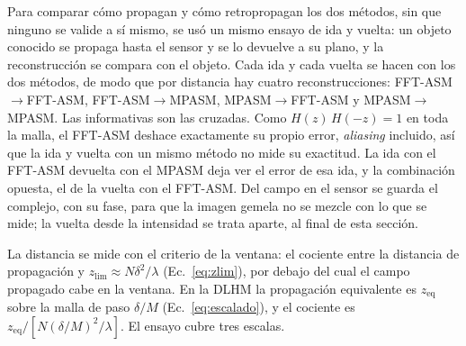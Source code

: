 Para comparar cómo propagan y cómo retropropagan los dos métodos, sin que
ninguno se valide a sí mismo, se usó un mismo ensayo de ida y vuelta: un
objeto conocido se propaga hasta el sensor y se lo devuelve a su plano, y la
reconstrucción se compara con el objeto. Cada ida y cada vuelta se hacen con
los dos métodos, de modo que por distancia hay cuatro reconstrucciones:
FFT-ASM$\to$FFT-ASM, FFT-ASM$\to$MPASM, MPASM$\to$FFT-ASM y MPASM$\to$MPASM.
Las informativas son las cruzadas. Como $H(z)\,H(-z) = 1$ en toda la malla, el
FFT-ASM deshace exactamente su propio error, \emph{aliasing} incluido, así que
la ida y vuelta con un mismo método no mide su exactitud. La ida con el
FFT-ASM devuelta con el MPASM deja ver el error de esa ida, y la combinación
opuesta, el de la vuelta con el FFT-ASM. Del campo en el sensor se guarda el
complejo, con su fase, para que la imagen gemela no se mezcle con lo que se
mide; la vuelta desde la intensidad se trata aparte, al final de esta sección.

La distancia se mide con el criterio de la ventana: el cociente entre la
distancia de propagación y $z_\mathrm{lim} \approx N\delta^2/\lambda$
(Ec.~\eqref{eq:zlim}), por debajo del cual el campo propagado cabe en la
ventana. En la DLHM la propagación equivalente es $z_\mathrm{eq}$ sobre la
malla de paso $\delta/M$ (Ec.~\eqref{eq:escalado}), y el cociente es
$z_\mathrm{eq}/[N(\delta/M)^2/\lambda]$. El ensayo cubre tres escalas.

